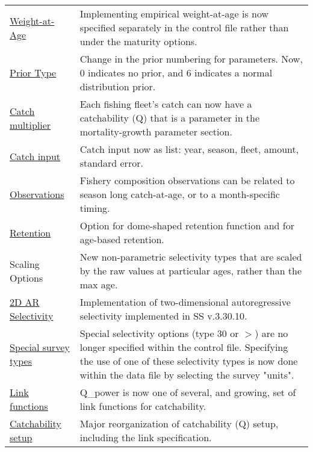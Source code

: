 \begin{center}
{\begin{longtable}{p{1.75cm} p{9.5cm}}
		\multicolumn{1}{l}{\hyperlink{WAAparm} {Weight-at-Age}} & Implementing empirical weight-at-age is now specified separately in the control file rather than under the maturity options.\\

		\multicolumn{1}{l}{\hyperlink{Priors}{Prior Type}} & Change in the prior numbering for parameters.  Now, 0 indicates no prior, and 6 indicates a normal distribution prior.\\
		
		\multicolumn{1}{l}{\hyperlink{CatchMult}{Catch multiplier}} & 
				Each fishing fleet's catch can now have a catchability (Q) that is a parameter in the mortality-growth parameter section.\\
				
		\multicolumn{1}{l}{\hyperlink{CatchFormat}{Catch input}} & 
				Catch input now as list:  year, season, fleet, amount, standard error. \\
				
		\multicolumn{1}{l}{\hyperlink{CompTiming}{Observations}} & 
				Fishery composition observations can be related to season long catch-at-age, or to a month-specific timing.\\
		
		\multicolumn{1}{l}{\hyperlink{DomeRetention}{Retention}} & 
				Option for dome-shaped retention function and for age-based retention. \\

		\multicolumn{1}{l}{Scaling Options} & 	
				New non-parametric selectivity types that are scaled by the raw values at particular ages, rather than the max age.\\
		\multicolumn{1}{l}{\hyperlink{2DAR}{2D AR Selectivity}} &
				Implementation of two-dimensional autoregressive selectivity implemented in SS v.3.30.10.\\

		\multicolumn{1}{l}{\hyperlink{SpecialSurvey}{Special survey types}} & 
				Special selectivity options (type 30 or $>$) are no longer specified within the control file.  Specifying the use of one of these selectivity types is now done within the data file by selecting the survey "units". \\  

		\multicolumn{1}{l}{\hyperlink{Qsetup}{Link functions}} & 
				Q\_power is now one of several, and growing, set of link functions for catchability. \\
				
		\multicolumn{1}{l}{\hyperlink{Qsetup}{Catchability setup}} & 
				Major reorganization of catchability (Q) setup, including the link specification. \\
			

\end{longtable}}
\end{center}
